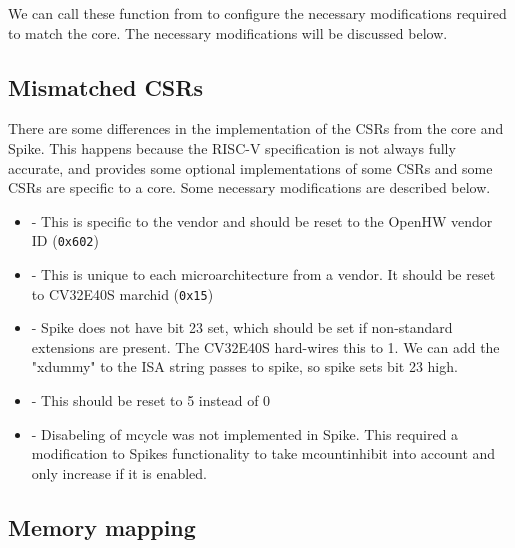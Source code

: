 We can call these function from  to configure the necessary modifications required to match the core. The necessary modifications will be discussed below. 

\subsection{Mismatched CSRs}

There are some differences in the implementation of the CSRs from the core and Spike. This happens because the RISC-V specification is not always fully accurate, and provides some optional implementations of some CSRs \cite{watermanRISCVInstructionSet2021} and some CSRs are specific to a core. Some necessary modifications are described below.

\begin{itemize}
    \item {}  - This is specific to the vendor and should be reset to the OpenHW vendor ID (\lstinline{0x602}) 
    \item {} - This is unique to each microarchitecture from a vendor. It should be reset to CV32E40S marchid (\lstinline{0x15})
    \item {} - Spike does not have bit 23 set, which should be set if non-standard extensions are present\cite{watermanRISCVInstructionSet2021}. The CV32E40S hard-wires this to 1. We can add the "xdummy" to the ISA string passes to spike, so spike sets bit 23 high.
    \item {} - This should be reset to 5 instead of 0
    \item {} - Disabeling of mcycle was not implemented in Spike. This required a modification to Spikes functionality to take mcountinhibit into account and only increase  if it is enabled.
\end{itemize}



\subsection{Memory mapping}

